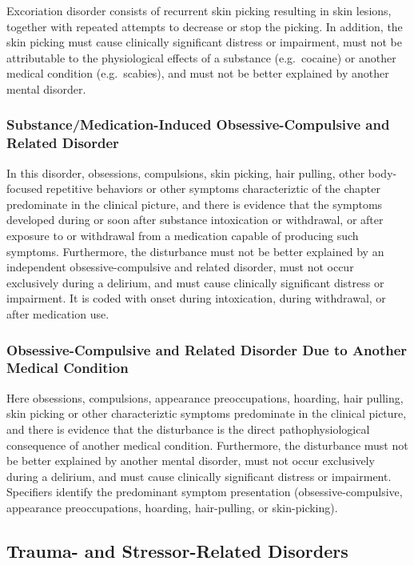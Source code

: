 Excoriation disorder consists of recurrent skin picking resulting in skin
lesions, together with repeated attempts to decrease or stop the picking. In addition, the skin picking must cause clinically significant distress or impairment, must not
be attributable to the physiological effects of a substance (e.g.\ cocaine) or
another medical condition (e.g.\ scabies), and must not be better explained by
another mental disorder.

\subsubsection{Substance/Medication-Induced Obsessive-Compulsive and Related
Disorder}

In this disorder, obsessions, compulsions, skin picking, hair pulling, other
body-focused repetitive behaviors or other symptoms characteriztic of the
chapter predominate in the clinical picture, and there is evidence that the
symptoms developed during or soon after substance intoxication or withdrawal, or
after exposure to or withdrawal from a medication capable of producing such
symptoms. Furthermore, the disturbance must not be better explained by an independent
obsessive-compulsive and related disorder, must not occur exclusively during a
delirium, and must cause clinically significant distress or impairment. It is
coded with onset during intoxication, during withdrawal, or after medication use.

\subsubsection{Obsessive-Compulsive and Related Disorder Due to Another Medical
Condition}

Here obsessions, compulsions, appearance preoccupations, hoarding, hair pulling,
skin picking or other characteriztic symptoms predominate in the clinical
picture, and there is evidence that the disturbance is the direct
pathophysiological consequence of another medical condition. Furthermore, the disturbance must not be better explained by another mental disorder, must not occur exclusively
during a delirium, and must cause clinically significant distress or impairment.
Specifiers identify the predominant symptom presentation (obsessive-compulsive,
appearance preoccupations, hoarding, hair-pulling, or skin-picking).

\subsection{Trauma- and Stressor-Related Disorders}

